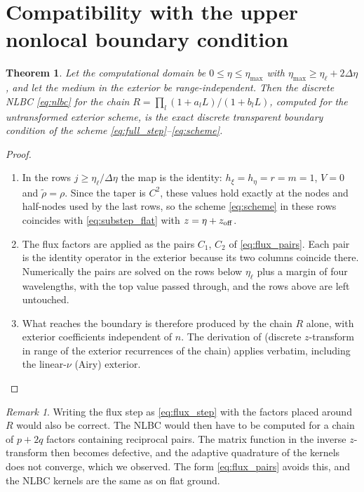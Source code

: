 \documentclass[11pt,a4paper]{article}
\newtheorem{theorem}{Theorem}
\theoremstyle{remark}
\newtheorem{remark}{Remark}
\newcommand{\rt}{\tilde\rho}
\newcommand{\het}{\nu}
\newcommand{\etal}{\eta_{\ell}}
\begin{document}
\section{Compatibility with the upper nonlocal boundary condition}\label{sec:nlbc}

\begin{theorem}\label{thm:nlbc}
Let the computational domain be $0\le\eta\le\eta_{\max}$ with
$\eta_{\max}\ge\etal+2\Delta\eta$, and let the medium in the exterior be
range-independent. Then the discrete NLBC \eqref{eq:nlbc} for the chain
$R=\prod_l(1+a_lL)/(1+b_lL)$, computed for the untransformed exterior scheme, is
the exact discrete transparent boundary condition of the scheme
\eqref{eq:full_step}--\eqref{eq:scheme}.
\end{theorem}
\begin{proof}
\begin{enumerate}
\item In the rows $j\ge\etal/\Delta\eta$ the map is the identity: $h_\xi=h_\eta=r=m=1$,
$V=0$ and $\rt=\rho$. Since the taper is $C^2$, these values hold exactly at the
nodes and half-nodes used by the last rows, so the scheme \eqref{eq:scheme} in
these rows coincides with \eqref{eq:substep_flat} with $z=\eta+z_{\rm off}$.
\item The flux factors are applied as the pairs $C_1$, $C_2$ of
\eqref{eq:flux_pairs}. Each pair is the identity operator in the exterior
because its two columns coincide there. Numerically the pairs are solved on the
rows below $\etal$ plus a margin of four wavelengths, with the top value passed
through, and the rows above are left untouched.
\item What reaches the boundary is therefore produced by the chain $R$ alone,
with exterior coefficients independent of $n$. The derivation of
\cite{lytaev2018awpl} (discrete $z$-transform in range of the exterior
recurrences of the chain) applies verbatim, including the linear-$\het$ (Airy)
exterior.
\end{enumerate}
\end{proof}

\begin{remark}
Writing the flux step as \eqref{eq:flux_step} with the factors placed around $R$
would also be correct. The NLBC would then have to be computed for a chain of
$p+2q$ factors containing reciprocal pairs. The matrix function in the inverse
$z$-transform then becomes defective, and the adaptive quadrature of the kernels
does not converge, which we observed. The form \eqref{eq:flux_pairs} avoids
this, and the NLBC kernels are the same as on flat ground.
\end{remark}
\end{document}
